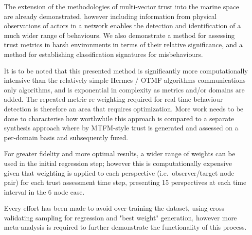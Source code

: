 The extension of the methodologies of multi-vector trust into the marine space are already demonstrated, however including information from physical observations of actors in a network enables the detection and identification of a much wider range of behaviours.
We also demonstrate a method for assessing trust metrics in harsh environments in terms of their relative significance, and a method for establishing classification signatures for misbehaviours.

It is to be noted that this presented method is significantly more computationally intensive than the relatively simple Hermes / OTMF algorithms communications only algorithms, and is exponential in complexity as metrics and/or domains are added. The repeated metric re-weighting required for real time behaviour detection is therefore an area that requires optimization. More work needs to be done to characterise how worthwhile this approach is compared to a separate synthesis approach where by MTFM-style trust is generated and assessed on a per-domain basis and subsequently fuzed.

For greater fidelity and more optimal results, a wider range of weights can be used in the initial regression step; however this is computationally expensive given that weighting is applied to each perspective (i.e.\ observer/target node pair) for each trust assessment time step, presenting 15 perspectives at each time interval in the 6 node case.

Every effort has been made to avoid over-training the dataset, using cross validating sampling for regression and "best weight" generation, however more meta-analysis is required to further demonstrate the functionality of this process.



